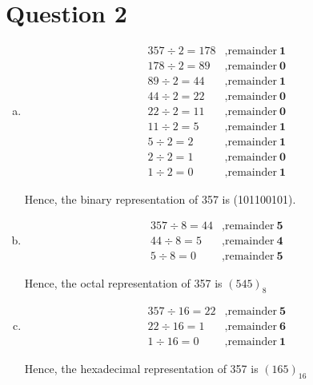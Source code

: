 \documentclass[12pt]{article}
\begin{document}
\section*{Question 2}
\begin{enumerate}[a.]
    \item

    \begin{align*}
        357 \div 2 = 178 &, \text{remainder}\:\textbf{1}\\
        178 \div 2 = 89 &, \text{remainder}\:\textbf{0}\\
        89 \div 2 = 44 &, \text{remainder}\:\textbf{1}\\
        44 \div 2 = 22 &, \text{remainder}\:\textbf{0}\\
        22 \div 2 = 11 &, \text{remainder}\:\textbf{0}\\
        11 \div 2 = 5 &, \text{remainder}\:\textbf{1}\\
        5 \div 2 = 2 &, \text{remainder}\:\textbf{1}\\
        2 \div 2 = 1 &, \text{remainder}\:\textbf{0}\\
        1 \div 2 = 0 &, \text{remainder}\:\textbf{1}
    \end{align*}

    Hence, the binary representation of 357 is (101100101).

    \item

    \begin{align*}
        357 \div 8 = 44 &, \text{remainder}\:\textbf{5}\\
        44 \div 8 = 5 &, \text{remainder}\:\textbf{4}\\
        5 \div 8 = 0 &, \text{remainder}\:\textbf{5}
    \end{align*}

    Hence, the octal representation of 357 is $(545)_8$

    \item

    \begin{align*}
        357 \div 16 = 22 &, \text{remainder}\:\textbf{5}\\
        22 \div 16 = 1 &, \text{remainder}\:\textbf{6}\\
        1 \div 16 = 0 &, \text{remainder}\:\textbf{1}
    \end{align*}

    Hence, the hexadecimal representation of 357 is $(165)_{16}$

\end{enumerate}
\end{document}
